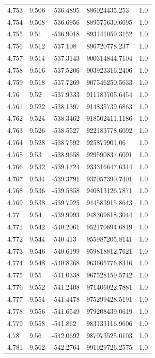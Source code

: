 \begin{tabular}{lllll}
4.753 & 9.506 & -536.4895 & 886024435.253 & 1.0 \\
4.754 & 9.508 & -536.6956 & 889575630.6695 & 1.0 \\
4.755 & 9.51 & -536.9018 & 893141059.3152 & 1.0 \\
4.756 & 9.512 & -537.108 & 896720778.237 & 1.0 \\
4.757 & 9.514 & -537.3143 & 900314844.7104 & 1.0 \\
4.758 & 9.516 & -537.5206 & 903923316.2406 & 1.0 \\
4.759 & 9.518 & -537.7269 & 907546250.5633 & 1.0 \\
4.76 & 9.52 & -537.9333 & 911183705.6454 & 1.0 \\
4.761 & 9.522 & -538.1397 & 914835739.6863 & 1.0 \\
4.762 & 9.524 & -538.3462 & 918502411.1186 & 1.0 \\
4.763 & 9.526 & -538.5527 & 922183778.6092 & 1.0 \\
4.764 & 9.528 & -538.7592 & 925879901.06 & 1.0 \\
4.765 & 9.53 & -538.9658 & 929590837.6091 & 1.0 \\
4.766 & 9.532 & -539.1724 & 933316647.6314 & 1.0 \\
4.767 & 9.534 & -539.3791 & 937057390.7401 & 1.0 \\
4.768 & 9.536 & -539.5858 & 940813126.7871 & 1.0 \\
4.769 & 9.538 & -539.7925 & 944583915.8643 & 1.0 \\
4.77 & 9.54 & -539.9993 & 948369818.3044 & 1.0 \\
4.771 & 9.542 & -540.2061 & 952170894.6819 & 1.0 \\
4.772 & 9.544 & -540.413 & 955987205.8141 & 1.0 \\
4.773 & 9.546 & -540.6199 & 959818812.7621 & 1.0 \\
4.774 & 9.548 & -540.8268 & 963665776.8316 & 1.0 \\
4.775 & 9.55 & -541.0338 & 967528159.5742 & 1.0 \\
4.776 & 9.552 & -541.2408 & 971406022.7881 & 1.0 \\
4.777 & 9.554 & -541.4478 & 975299428.5191 & 1.0 \\
4.778 & 9.556 & -541.6549 & 979208439.0619 & 1.0 \\
4.779 & 9.558 & -541.862 & 983133116.9606 & 1.0 \\
4.78 & 9.56 & -542.0692 & 987073525.0103 & 1.0 \\
4.781 & 9.562 & -542.2764 & 991029726.2575 & 1.0 \\

\end{tabular}
